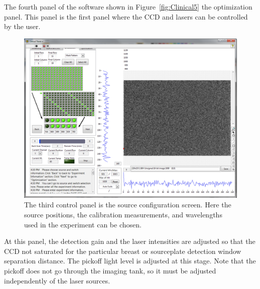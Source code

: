 The fourth panel of the software shown in Figure~\ref{fig:Clinical5} the optimization panel. This panel is the first panel where the CCD and lasers can be controlled by the user. 
\begin{figure}[h]
\centering
\includegraphics[width=13.5cm]{./figures/A_Gen3Software/Clinical4.png}
\caption[Measurement setup panel in the clinical software]{The third control panel is the source configuration screen. Here the source positions, the calibration measurements, and wavelengths used in the experiment can be chosen.}
\label{fig:Clinical4}
\end{figure}
At this panel, the detection gain and the laser intensities are adjusted so that the CCD not saturated for the particular breast or sourceplate detection window separation distance. The pickoff light level is adjusted at this stage. Note that the pickoff does not go through the imaging tank, so it must be adjusted independently of the laser sources.

